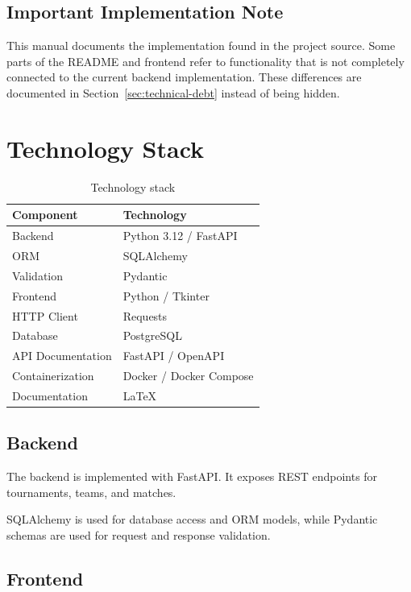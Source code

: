 \documentclass[12pt,a4paper]{article}
\begin{document}
\subsection{Important Implementation Note}

This manual documents the implementation found in the project source.
Some parts of the README and frontend refer to functionality that is
not completely connected to the current backend implementation.
These differences are documented in Section~\ref{sec:technical-debt}
instead of being hidden.


\section{Technology Stack}

\begin{table}[H]
\centering
\begin{tabular}{ll}
\toprule
\textbf{Component} & \textbf{Technology} \\
\midrule
Backend & Python 3.12 / FastAPI \\
ORM & SQLAlchemy \\
Validation & Pydantic \\
Frontend & Python / Tkinter \\
HTTP Client & Requests \\
Database & PostgreSQL \\
API Documentation & FastAPI / OpenAPI \\
Containerization & Docker / Docker Compose \\
Documentation & LaTeX \\
\bottomrule
\end{tabular}
\caption{Technology stack}
\end{table}

\subsection{Backend}

The backend is implemented with FastAPI. It exposes REST endpoints
for tournaments, teams, and matches.

SQLAlchemy is used for database access and ORM models, while Pydantic
schemas are used for request and response validation.

\subsection{Frontend}
\end{document}
